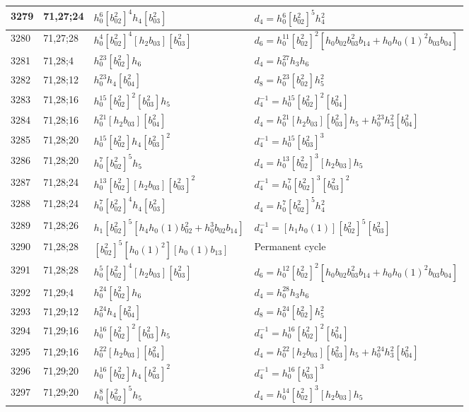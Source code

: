 \documentclass{article}
\begin{document}
\begin{longtable}{|l|l|>{\raggedright\arraybackslash}p{6cm}|>{\raggedright\arraybackslash}p{6cm}|}
3279 & 71,27;24 & $h_0^6[b_{02}^2]^4h_4[b_{03}^2]$ &$d_{4}=h_0^6[b_{02}^2]^5h_4^2$\\
\hline
3280 & 71,27;28 & $h_0^4[b_{02}^2]^4[h_2b_{03}][b_{03}^2]$ &$d_{6}=h_0^{11}[b_{02}^2]^2[h_0b_{02}b_{03}^2b_{14} + h_0h_0(1)^2b_{03}b_{04}]$\\
\hline
3281 & 71,28;4 & $h_0^{23}[b_{02}^2]h_6$ &$d_{4}=h_0^{27}h_3h_6$\\
\hline
3282 & 71,28;12 & $h_0^{23}h_4[b_{04}^2]$ &$d_{8}=h_0^{23}[b_{02}^2]h_5^2$\\
\hline
3283 & 71,28;16 & $h_0^{15}[b_{02}^2]^2[b_{03}^2]h_5$ & $d_{4}^{-1}=h_0^{15}[b_{02}^2]^2[b_{04}^2]$\\
3284 & 71,28;16 & $h_0^{21}[h_2b_{03}][b_{04}^2]$ &$d_{4}=h_0^{21}[h_2b_{03}][b_{03}^2]h_5 + h_0^{23}h_3^2[b_{04}^2]$\\
\hline
3285 & 71,28;20 & $h_0^{15}[b_{02}^2]h_4[b_{03}^2]^2$ & $d_{4}^{-1}=h_0^{15}[b_{03}^2]^3$\\
3286 & 71,28;20 & $h_0^7[b_{02}^2]^5h_5$ &$d_{4}=h_0^{13}[b_{02}^2]^3[h_2b_{03}]h_5$\\
\hline
3287 & 71,28;24 & $h_0^{13}[b_{02}^2][h_2b_{03}][b_{03}^2]^2$ & $d_{4}^{-1}=h_0^7[b_{02}^2]^3[b_{03}^2]^2$\\
3288 & 71,28;24 & $h_0^7[b_{02}^2]^4h_4[b_{03}^2]$ &$d_{4}=h_0^7[b_{02}^2]^5h_4^2$\\
\hline
3289 & 71,28;26 & $h_1[b_{02}^2]^5[h_4h_0(1)b_{02}^2 + h_0^3b_{02}b_{14}]$ & $d_{4}^{-1}=[h_1h_0(1)][b_{02}^2]^5[b_{03}^2]$\\
\hline
3290 & 71,28;28 & $[b_{02}^2]^5[h_0(1)^2][h_0(1)b_{13}]$ & Permanent cycle\\
3291 & 71,28;28 & $h_0^5[b_{02}^2]^4[h_2b_{03}][b_{03}^2]$ &$d_{6}=h_0^{12}[b_{02}^2]^2[h_0b_{02}b_{03}^2b_{14} + h_0h_0(1)^2b_{03}b_{04}]$\\
\hline
3292 & 71,29;4 & $h_0^{24}[b_{02}^2]h_6$ &$d_{4}=h_0^{28}h_3h_6$\\
\hline
3293 & 71,29;12 & $h_0^{24}h_4[b_{04}^2]$ &$d_{8}=h_0^{24}[b_{02}^2]h_5^2$\\
\hline
3294 & 71,29;16 & $h_0^{16}[b_{02}^2]^2[b_{03}^2]h_5$ & $d_{4}^{-1}=h_0^{16}[b_{02}^2]^2[b_{04}^2]$\\
3295 & 71,29;16 & $h_0^{22}[h_2b_{03}][b_{04}^2]$ &$d_{4}=h_0^{22}[h_2b_{03}][b_{03}^2]h_5 + h_0^{24}h_3^2[b_{04}^2]$\\
\hline
3296 & 71,29;20 & $h_0^{16}[b_{02}^2]h_4[b_{03}^2]^2$ & $d_{4}^{-1}=h_0^{16}[b_{03}^2]^3$\\
3297 & 71,29;20 & $h_0^8[b_{02}^2]^5h_5$ &$d_{4}=h_0^{14}[b_{02}^2]^3[h_2b_{03}]h_5$\\

\end{longtable}
\end{document}
